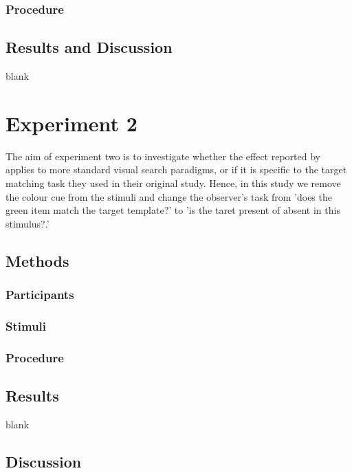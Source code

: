 \documentclass[smallextended]{svjour3}       %
\begin{document}
\subsubsection{Procedure}

\subsection{Results and Discussion}

blank


\section{Experiment 2}
\label{sec:exp2}

The aim of experiment two is to investigate whether the effect reported by \cite{reinhart2015} applies to more standard visual search paradigms, or if it is specific to the target matching task they used in their original study. Hence, in this study we remove the colour cue from the stimuli and change the observer's task from 'does the green item match the target template?' to 'is the taret present of absent in this stimulus?.' 

\subsection{Methods}

\subsubsection{Participants}

\subsubsection{Stimuli}

\subsubsection{Procedure}

\subsection{Results}

blank

\subsection{Discussion}
\end{document}

